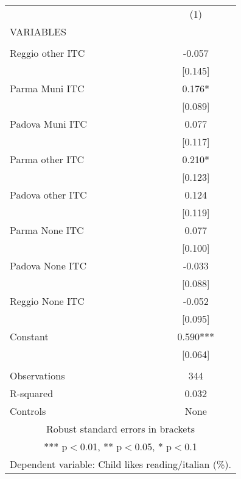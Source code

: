 \begin{tabular}{lc} \hline
 & (1) \\
VARIABLES &  \\ \hline
 &  \\
Reggio other ITC & -0.057 \\
 & [0.145] \\
Parma Muni ITC & 0.176* \\
 & [0.089] \\
Padova Muni ITC & 0.077 \\
 & [0.117] \\
Parma other ITC & 0.210* \\
 & [0.123] \\
Padova other ITC & 0.124 \\
 & [0.119] \\
Parma None ITC & 0.077 \\
 & [0.100] \\
Padova None ITC & -0.033 \\
 & [0.088] \\
Reggio None ITC & -0.052 \\
 & [0.095] \\
Constant & 0.590*** \\
 & [0.064] \\
 &  \\
Observations & 344 \\
R-squared & 0.032 \\
 Controls & None \\ \hline
\multicolumn{2}{c}{ Robust standard errors in brackets} \\
\multicolumn{2}{c}{ *** p$<$0.01, ** p$<$0.05, * p$<$0.1} \\
\multicolumn{2}{c}{ Dependent variable: Child likes reading/italian (\%).} \\
\end{tabular}
